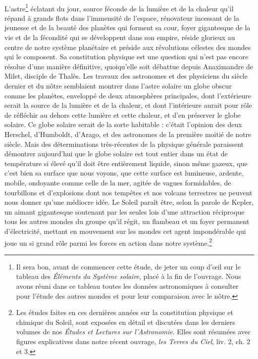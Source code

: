 \documentclass[a4paper, 11pt, oneside]{article}
\begin{document}
\paragraph{}
L'astre\footnote{Il sera bon, avant de commencer cette étude, de jeter un coup d'œil sur le tableau des \emph{Éléments du Système solaire}, placé à la fin de l'ouvrage. Nous avons réuni dans ce tableau toutes les données astronomiques à consulter pour l'étude des autres mondes et pour leur comparaison avec le nôtre.} éclatant du jour, source féconde de la lumière et de la chaleur qu'il répand à grands flots dans l'immensité de l'espace, rénovateur incessant de la jeunesse et de la beauté des planètes qui forment sa cour, foyer gigantesque de la vie et de la fécondité qui se développent dans son empire, réside glorieux au centre de notre système planétaire et préside aux révolutions célestes des mondes qui le composent. Sa constitution physique est une question qui n'est pas encore résolue d'une manière définitive, quoiqu'elle soit débattue depuis Anaximandre de Milet, disciple de Thalès. Les travaux des astronomes et des physiciens du siècle dernier et du nôtre semblaient montrer dans l'astre solaire un globe obscur comme les planètes, enveloppé de deux atmosphères principales, dont l'extérieure serait la source de la lumière et de la chaleur, et dont l'intérieure aurait pour rôle de réfléchir au dehors cette lumière et cette chaleur, et d'en préserver le globe solaire. Ce globe solaire serait de la sorte habitable : c'était l'opinion des deux Herschel, d'Humboldt, d'Arago, et des astronomes de la première moitié de notre siècle. Mais des déterminations très-récentes de la physique générale paraissent démontrer aujourd'hui que le globe solaire est tout entier dans un état de température si élevé qu'il doit être entièrement liquide, sinon même gazeux, que c'est bien sa surface que nous voyons, que cette surface est lumineuse, ardente, mobile, ondoyante comme celle de la mer, agitée de vagues formidables, de tourbillons et d'explosions dont nos tempêtes et nos volcans terrestres ne peuvent nous donner qu'une médiocre idée. Le Soleil paraît être, selon la parole de Kepler, un aimant gigantesque soutenant par les seules lois d'une attraction réciproque tous les autres mondes du groupe qu'il régit, un flambeau et un foyer permanent d'électricité, mettant en mouvement sur les mondes cet agent impondérable qui joue un si grand rôle parmi les forces en action dans notre système.\footnote{Les études faites en ces dernières années sur la constitution physique et chimique du Soleil, sont exposées en détail et discutées dans les derniers volumes de nos \emph{Études et Lectures sur l'Astronomie}. Elles sont résumées avec figures explicatives dans notre récent ouvrage, \emph{les Terres du Ciel}, liv. 2, ch. 2 et 3.}
\end{document}
